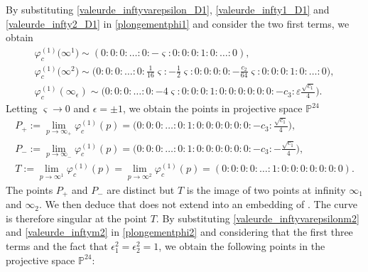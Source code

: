 \documentclass[10pt,a4paper]{amsart}
\numberwithin{equation}{section}
\begin{document}
By substituting \eqref{valeurde_inftyvarepsilon_D1},
\eqref{valeurde_infty1_D1} and \eqref{valeurde_infty2_D1} in
\eqref{plongementphi1} and consider the two first terms, we obtain
\begin{gather*}
 \varphi_c^{(1)}\bigl(\infty^1\bigr) \sim (0:0:0:\dots:0:-\varsigma:0:0:0:1:0:\dots:0),\\
\varphi_c^{(1)}\bigl(\infty^2\bigr) \sim \biggl(0:0:0:\dots:0:\frac{1}{16}\varsigma:-\frac{1}{2}\varsigma:0:0:0:0:-\frac{c_2}{64}\varsigma:0:0:0:1:0:\dots:0\biggr),\\
 \varphi_c^{(1)}(\infty_\epsilon) \sim \biggl(0:0:0:\dots:0:-4\varsigma:0:0:0:1:0:0:0:0:0:0:-c_3:\varepsilon\frac{\sqrt{c_1}}{4}\biggr).
\end{gather*}
Letting $\varsigma \rightarrow 0$ and $\epsilon=\pm 1$, we obtain
the points in projective space $\mathbb{P}^{24}$
\begin{gather*}
 P_+ :=\lim \limits_{p\rightarrow \infty_{+}}\varphi_c^{(1)}(p)
 =\biggl(0:0:0:\dots:0:1:0:0:0:0:0:0:-c_3:\frac{\sqrt{c_1}}{4}\biggr),\\
 P_- :=\lim \limits_{p\rightarrow
\infty_{-}}\varphi_c^{(1)}(p)
 =\biggl(0:0:0:\dots:0:1:0:0:0:0:0:0:-c_3:-\frac{\sqrt{c_1}}{4}\biggr),\\
 T :=\lim \limits_{p\rightarrow \infty^1}\varphi_c^{(1)}
 (p) =\lim \limits_{p\rightarrow \infty^2}\varphi_c^{(1)}(p)=
 (0:0:0:0:\dots:1:0:0:0:0:0:0:0).
\end{gather*}
The points $P_+$ and $P_-$ are distinct but $T$ is the image of two
points at infinity $\infty_{1}$ and $\infty_{2}$. We then deduce
that  does not extend into an embedding
of . The curve
 is therefore singular at the point
$T$.
 By substituting \eqref{valeurde_inftyvarepsilonm2} and
\eqref{valeurde_inftym2} in \eqref{plongementphi2} and considering
that the first three terms and the fact that
$\epsilon_1^2=\epsilon_2^2=1$, we obtain the following points in the
projective space $\mathbb{P}^{24}$:
\end{document}
